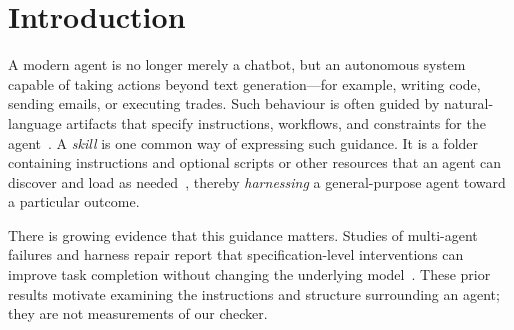 \documentclass{article}
\theoremstyle{plain}
\theoremstyle{definition}
\begin{document}
\begin{abstract}
skills with frozen tasks, real public inputs and independent verifiers, using
four hosted models and five repeats each (\ValueTrials{} trials). Every
execution runs whatever the verdict, so each verdict is compared with the
verified outcome. Over all \ValueTrials{} trials, the gate blocks \ValueTP{}
of the \ValueFailed{} trials on unreachable tasks and \ValueFP{} of the
\ValueFP{}+\ValueTN{} on reachable ones; all wrong blocks come from invalid
packs of one model, none from the checker. Recall depends on the compacting
model: \ValueCodexRecall{}, \ValueSolRecall{}, \ValueSonnetRecall{} and
\ValueOpusRecall{} for the four models. Misses come
from compaction, which mostly weakens the goal so that reporting the failure
counts as success. Overall the gate costs more tokens than it avoids; with the
two strongest compacting models it pays for itself on the unreachable tasks. A
break-even model with the measured parameters shows when early blocking pays
off: when failures are expensive or common, or when packs are reused.

\end{abstract}

\section{Introduction}\label{sec:introduction}

A modern agent is no longer merely a chatbot, but an autonomous system capable of taking actions beyond text generation---for example, writing code, sending emails, or executing trades. Such behaviour is often guided by natural-language artifacts that specify instructions, workflows, and constraints for the agent~\cite{harnesssurvey,harnessfix,adas,aflow}. A \emph{skill} is one common way of expressing such guidance. It is a folder containing instructions and optional scripts or other resources that an agent can discover and load as needed~\cite{agentskills}, thereby \emph{harnessing} a general-purpose agent toward a particular outcome.

There is growing evidence that this guidance matters.
Studies of multi-agent failures and harness repair report that
specification-level interventions can improve task completion without
changing the underlying model~\cite{cemri,harnessfix}. These prior results
motivate examining the instructions and structure surrounding an agent;
they are not measurements of our checker.
\end{document}
